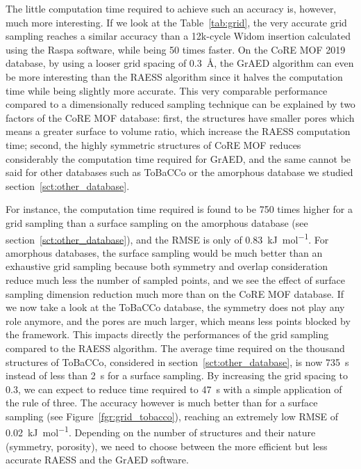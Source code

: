 \documentclass[main]{subfiles}
\begin{document}
The little computation time required to achieve such an accuracy is, however, much more interesting. If we look at the Table~\ref{tab:grid}, the very accurate grid sampling reaches a similar accuracy than a 12k-cycle Widom insertion calculated using the Raspa software, while being 50 times faster. On the CoRE MOF 2019 database, by using a looser grid spacing of \SI{0.3}{\angstrom}, the GrAED algorithm can even be more interesting than the RAESS algorithm since it halves the computation time while being slightly more accurate. This very comparable performance compared to a dimensionally reduced sampling technique can be explained by two factors of the CoRE MOF database: first, the structures have smaller pores which means a greater surface to volume ratio, which increase the RAESS computation time; second, the highly symmetric structures of CoRE MOF reduces considerably the computation time required for GrAED, and the same cannot be said for other databases such as ToBaCCo or the amorphous database we studied section~\ref{sct:other_database}. 

For instance, the computation time required is found to be 750 times higher for a grid sampling than a surface sampling on the amorphous database (see section~\ref{sct:other_database}), and the RMSE is only of \SI{0.83}{\kJ\per\mol}. For amorphous databases, the surface sampling would be much better than an exhaustive grid sampling because both symmetry and overlap consideration reduce much less the number of sampled points, and we see the effect of surface sampling dimension reduction much more than on the CoRE MOF database. If we now take a look at the ToBaCCo database,\autocite{Colon_2017} the symmetry does not play any role anymore, and the pores are much larger, which means less points blocked by the framework. This impacts directly the performances of the grid sampling compared to the RAESS algorithm. The average time required on the thousand structures of ToBaCCo, considered in section~\ref{sct:other_database}, is now \SI{735}{\s} instead of less than \SI{2}{\s} for a surface sampling. By increasing the grid spacing to $0.3$, we can expect to reduce time required to \SI{47}{\s} with a simple application of the rule of three. The accuracy however is much better than for a surface sampling (see Figure~\ref{fgr:grid_tobacco}), reaching an extremely low RMSE of \SI{0.02}{\kJ\per\mol}. Depending on the number of structures and their nature (symmetry, porosity), we need to choose between the more efficient but less accurate RAESS and the GrAED software.
\end{document}
